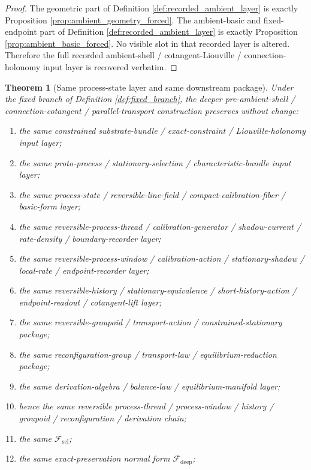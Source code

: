 \documentclass[11pt]{article}
\newcommand{\DeepFunctional}{\mathscr F_{\mathrm{deep}}}
\newcommand{\StemFunctional}{\mathscr F_{\mathrm{sel}}}
\newtheorem{theorem}{Theorem}
\begin{document}
\begin{proof}
The geometric part of Definition \ref{def:recorded_ambient_layer} is exactly Proposition \ref{prop:ambient_geometry_forced}. The ambient-basic and fixed-endpoint part of Definition \ref{def:recorded_ambient_layer} is exactly Proposition \ref{prop:ambient_basic_forced}. No visible slot in that recorded layer is altered. Therefore the full recorded ambient-shell / cotangent-Liouville / connection-holonomy input layer is recovered verbatim.
\end{proof}

\begin{theorem}[Same process-state layer and same downstream package]
\label{thm:same_package}
Under the fixed branch of Definition \ref{def:fixed_branch}, the deeper pre-ambient-shell / connection-cotangent / parallel-transport construction preserves without change:
\begin{enumerate}
    \item the same constrained substrate-bundle / exact-constraint / Liouville-holonomy input layer;
    \item the same proto-process / stationary-selection / characteristic-bundle input layer;
    \item the same process-state / reversible-line-field / compact-calibration-fiber / basic-form layer;
    \item the same reversible-process-thread / calibration-generator / shadow-current / rate-density / boundary-recorder layer;
    \item the same reversible-process-window / calibration-action / stationary-shadow / local-rate / endpoint-recorder layer;
    \item the same reversible-history / stationary-equivalence / short-history-action / endpoint-readout / cotangent-lift layer;
    \item the same reversible-groupoid / transport-action / constrained-stationary package;
    \item the same reconfiguration-group / transport-law / equilibrium-reduction package;
    \item the same derivation-algebra / balance-law / equilibrium-manifold layer;
    \item hence the same reversible process-thread / process-window / history / groupoid / reconfiguration / derivation chain;
    \item the same \(\StemFunctional\);
    \item the same exact-preservation normal form \(\DeepFunctional\);

\end{enumerate}
\end{theorem}
\end{document}
